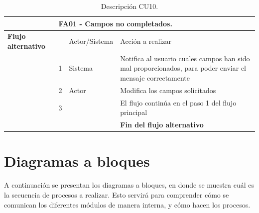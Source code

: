 \documentclass[12pt,oneside,onecolumn,openany]{report}
\begin{document}
\begin{table}[H]
{\begin{tabular}{| p{} | p{} |p{4cm}|p{5cm}|}
     \hline
     & \multicolumn{3}{|l|}{\textbf{FA01 - Campos no completados}.}\\
     \hline
     \textbf{Flujo alternativo} & & Actor/Sistema & Acción a realizar\\
     \hline
     & 1 & Sistema & Notifica al usuario cuales campos han sido mal proporcionados, para poder enviar el mensaje correctamente\\
     \hline
     & 2 & Actor & Modifica los campos solicitados\\
     \hline
     & 3 &  & El flujo continúa en el paso 1 del flujo principal\\
     \hline
     &  & & \textbf{Fin del flujo alternativo}\\
     
     \end{tabular}
    }
    \caption{Descripción CU10.}
    \label{tabla:CU10}
\end{table}



\pagebreak
\section{Diagramas a bloques}
A continuación se presentan los diagramas a bloques, en donde se muestra cuál es la secuencia de procesos a realizar. Esto servirá para comprender cómo se comunican los diferentes módulos de manera interna, y cómo hacen los procesos.
\end{document}
